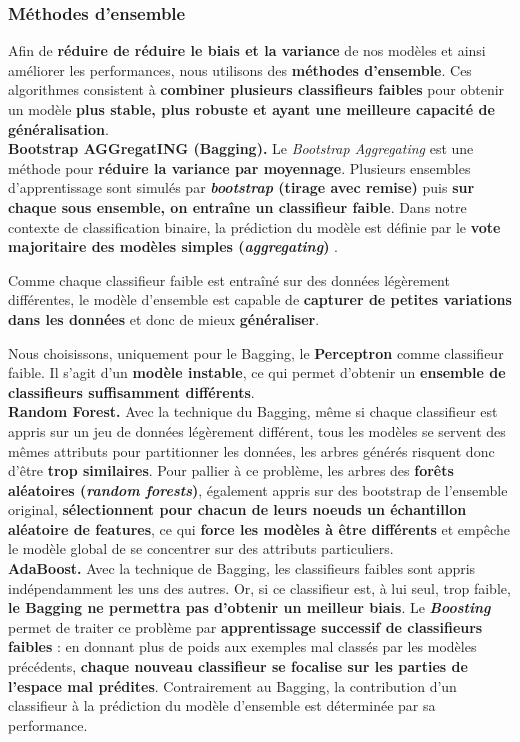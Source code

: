 \documentclass[12pt]{article}
\begin{document}
\subsubsection{Méthodes d'ensemble}

Afin de \textbf{réduire de réduire le biais et la variance} de nos modèles et
ainsi améliorer les performances, nous utilisons des \textbf{méthodes
d'ensemble}. Ces algorithmes consistent à \textbf{combiner plusieurs classifieurs
faibles} pour obtenir un modèle \textbf{plus stable, plus robuste et ayant une meilleure
capacité de généralisation}. \\

\textbf{Bootstrap AGGregatING (Bagging). } \quad Le \emph{Bootstrap Aggregating}
est une méthode pour \textbf{réduire la variance par moyennage}.  Plusieurs
ensembles d'apprentissage sont simulés par \textbf{\emph{bootstrap} (tirage avec
remise)} puis \textbf{sur chaque sous ensemble, on entraîne un classifieur
faible}.  Dans notre contexte de classification binaire, la prédiction du modèle
est définie par le \textbf{vote majoritaire des modèles simples
(\emph{aggregating})} .

Comme chaque classifieur faible est entraîné sur des données légèrement
différentes, le modèle d'ensemble est capable de \textbf{capturer de petites
variations dans les données} et donc de mieux \textbf{généraliser}. 

Nous choisissons, uniquement pour le Bagging, le \textbf{Perceptron} comme
classifieur faible. Il s'agit d'un \textbf{modèle instable}, ce qui permet
d'obtenir un \textbf{ensemble de classifieurs suffisamment différents}. \\

\textbf{Random Forest. } \quad Avec la technique du Bagging, même si chaque
classifieur est appris sur un jeu de données légèrement différent, tous les
modèles se servent des mêmes attributs pour partitionner les données, les arbres
générés risquent donc d'être \textbf{trop similaires}. Pour pallier à ce
problème, les arbres des \textbf{forêts aléatoires (\emph{random forests})},
également appris sur des bootstrap de l'ensemble original, \textbf{sélectionnent
pour chacun de leurs noeuds un échantillon aléatoire de features}, ce qui
\textbf{force les modèles à être différents} et empêche le modèle global de se
concentrer sur des attributs particuliers. \\

\textbf{AdaBoost. } \quad Avec la technique de Bagging, les classifieurs faibles
sont appris indépendamment les uns des autres. Or, si ce classifieur est, à lui
seul, trop faible, \textbf{le Bagging ne permettra pas d'obtenir un meilleur
biais}. Le \textbf{\emph{Boosting}} permet de traiter ce problème par
\textbf{apprentissage successif de classifieurs faibles} : en donnant plus de
poids aux exemples mal classés par les modèles précédents, \textbf{chaque
nouveau classifieur se focalise sur les parties de l'espace mal prédites}.
Contrairement au Bagging, la contribution d'un classifieur à la prédiction du
modèle d'ensemble est déterminée par sa performance.
\end{document}
